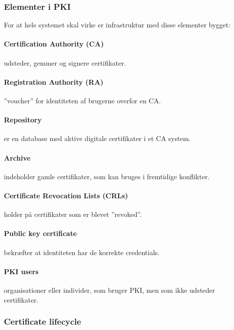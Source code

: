 \subsubsection{Elementer i PKI}
For at hele systemet skal virke er infrastruktur med disse elementer bygget: 

\paragraph{Certification Authority (CA)} udsteder, gemmer og signere certifikater.

\paragraph{Registration Authority (RA)} ''voucher'' for identiteten af brugerne overfor en CA.

\paragraph{Repository} er en database med aktive digitale certifikater i et CA system.

\paragraph{Archive} indeholder gamle certifikater, som kan bruges i fremtidige konflikter.

\paragraph{Certificate Revocation Lists (CRLs)} holder på certifikater som er blevet ''revoked''.

\paragraph{Public key certificate} bekræfter at identiteten har de korrekte credentials.

\paragraph{PKI users} organisationer eller individer, som bruger PKI, men som ikke udsteder certifikater.

\subsubsection{Certificate lifecycle}

